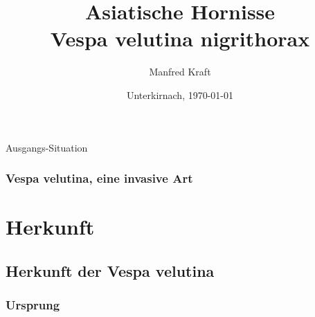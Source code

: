 \documentclass[aspectratio=169]{beamer}
\begin{document}

\author[Manfred]{Manfred Kraft}
 
\title[Vespa velutina-240310]{\textbf{Asiatische Hornisse \\ Vespa velutina nigrithorax}}
\date{Unterkirnach, \today}

\frame{\titlepage}



\begin{frame}{Ausgangs-Situation}
\frametitle{{Vespa velutina, eine invasive Art}}
\framesubtitle{} 


\tableofcontents[hideallsubsections]
\end{frame}                 

\section{Herkunft}

\subsection[Ausgangslage]{Herkunft der Vespa velutina}

\subsubsection[Ursprung]{Ursprung}
\end{document}
